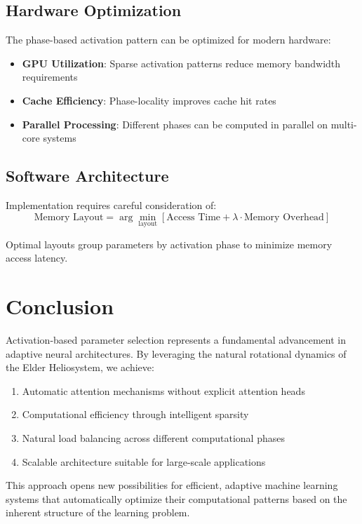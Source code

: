 \subsection{Hardware Optimization}

The phase-based activation pattern can be optimized for modern hardware:
\begin{itemize}
    \item \textbf{GPU Utilization}: Sparse activation patterns reduce memory bandwidth requirements
    \item \textbf{Cache Efficiency}: Phase-locality improves cache hit rates
    \item \textbf{Parallel Processing}: Different phases can be computed in parallel on multi-core systems
\end{itemize}

\subsection{Software Architecture}

Implementation requires careful consideration of:
\begin{equation}
\text{Memory Layout} = \arg\min_{\text{layout}} \left[\text{Access Time} + \lambda \cdot \text{Memory Overhead}\right]
\end{equation}

Optimal layouts group parameters by activation phase to minimize memory access latency.

\section{Conclusion}

Activation-based parameter selection represents a fundamental advancement in adaptive neural architectures. By leveraging the natural rotational dynamics of the Elder Heliosystem, we achieve:

\begin{enumerate}
    \item Automatic attention mechanisms without explicit attention heads
    \item Computational efficiency through intelligent sparsity
    \item Natural load balancing across different computational phases
    \item Scalable architecture suitable for large-scale applications
\end{enumerate}

This approach opens new possibilities for efficient, adaptive machine learning systems that automatically optimize their computational patterns based on the inherent structure of the learning problem.